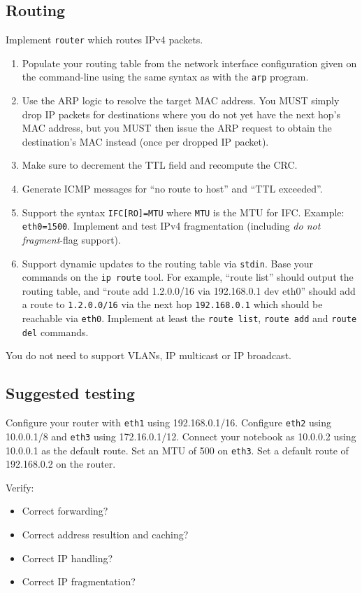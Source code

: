 \documentclass{article}
\begin{document}
\subsection{Routing}

Implement {\tt router} which routes IPv4 packets.
\begin{enumerate}
\item Populate your routing table from the network interface configuration
  given on the command-line using the same syntax as with the {\tt arp}
  program.
\item Use the ARP logic to resolve the target MAC address.  You MUST
  simply drop IP packets for destinations where you do not yet have the
  next hop's MAC address, but you MUST then issue the ARP request to
  obtain the destination's MAC instead (once per dropped IP packet).
\item Make sure to decrement the TTL field and recompute the CRC.
\item Generate ICMP messages for ``no route to host'' and ``TTL exceeded''.
\item Support the syntax {\tt IFC[RO]=MTU} where {\tt MTU} is the
  MTU for IFC.  Example: {\tt eth0=1500}.  Implement and test IPv4 fragmentation
  (including {\em do not fragment}-flag support).
\item Support dynamic updates to the routing table via {\tt stdin}.
  Base your commands on the {\tt ip route} tool.  For example,
  ``route list'' should output the routing table, and
  ``route add 1.2.0.0/16 via 192.168.0.1 dev eth0'' should add
  a route to {\tt 1.2.0.0/16} via the next hop {\tt 192.168.0.1}
  which should be reachable via {\tt eth0}.  Implement at least
  the {\tt route list}, {\tt route add} and {\tt route del} commands.
\end{enumerate}

You do not need to support VLANs, IP multicast or IP broadcast.

\subsection{Suggested testing}

Configure your router with {\tt eth1} using 192.168.0.1/16.  Configure
{\tt eth2} using 10.0.0.1/8 and {\tt eth3} using 172.16.0.1/12.
Connect your notebook as 10.0.0.2 using 10.0.0.1 as the default
route. Set an MTU of 500 on {\tt eth3}.  Set a default route of
192.168.0.2 on the router.

Verify:
\begin{itemize}
\item Correct forwarding? %
\item Correct address resultion and caching? %
\item Correct IP handling? %
\item Correct IP fragmentation? %
\end{itemize}
\end{document}
